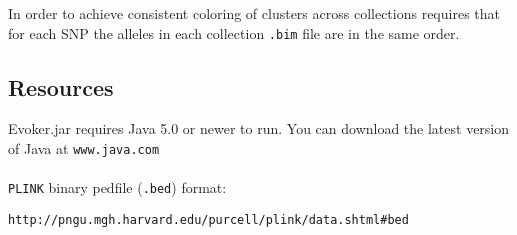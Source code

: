 \documentclass{article}
\begin{document}
\noindent In order to achieve consistent coloring of clusters across collections requires that for each SNP the alleles in each collection \texttt{.bim} file are in the same order.

\subsection{Resources}
Evoker.jar requires Java 5.0 or newer to run. You can download the latest version of Java at \texttt{www.java.com}
\\
\\
\texttt{PLINK} binary pedfile (\texttt{.bed}) format:  

\indent \texttt{http://pngu.mgh.harvard.edu/purcell/plink/data.shtml\#bed}
\end{document}

